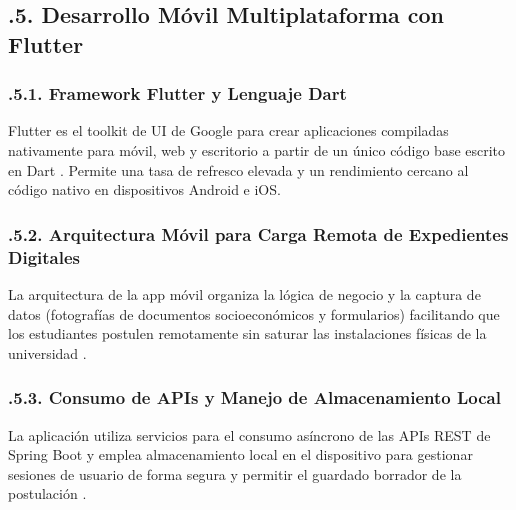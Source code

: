 \subsection{.5. Desarrollo Móvil Multiplataforma con Flutter}\label{sec:mobile_flutter}

\subsubsection{.5.1. Framework Flutter y Lenguaje Dart}\label{sec:flutter_dart}

Flutter es el toolkit de UI de Google para crear aplicaciones compiladas nativamente para móvil, web y escritorio a partir de un único código base escrito en Dart \parencite{windmill2020flutter}. Permite una tasa de refresco elevada y un rendimiento cercano al código nativo en dispositivos Android e iOS.

\subsubsection{.5.2. Arquitectura Móvil para Carga Remota de Expedientes Digitales}\label{sec:flutter_carga_expedientes}

La arquitectura de la app móvil organiza la lógica de negocio y la captura de datos (fotografías de documentos socioeconómicos y formularios) facilitando que los estudiantes postulen remotamente sin saturar las instalaciones físicas de la universidad \parencite{esposito2012mobileenterprise}.

\subsubsection{.5.3. Consumo de APIs y Manejo de Almacenamiento Local}\label{sec:flutter_apis_almacenamiento}

La aplicación utiliza servicios para el consumo asíncrono de las APIs REST de Spring Boot y emplea almacenamiento local en el dispositivo para gestionar sesiones de usuario de forma segura y permitir el guardado borrador de la postulación \parencite{miola2020flutter}.
